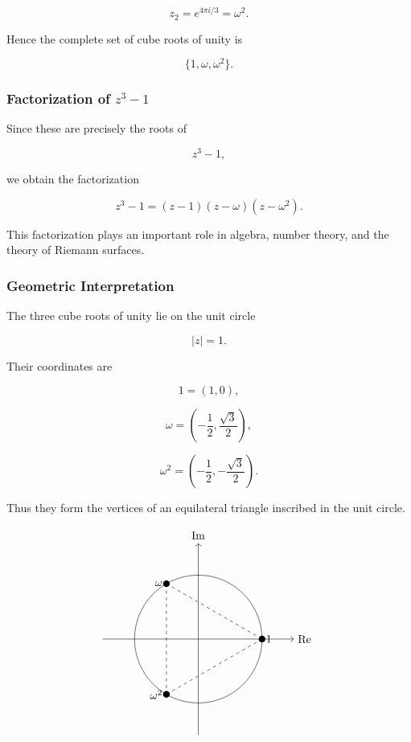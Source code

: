 \documentclass[12pt,a4paper]{article}
\theoremstyle{notespace}
\begin{document}
\[
z_2=e^{4\pi i/3}=\omega^2.
\]

Hence the complete set of cube roots of unity is

\[
\boxed{\{1,\omega,\omega^2\}}.
\]

\subsubsection{Factorization of \(z^3-1\)}

Since these are precisely the roots of

\[
z^3-1,
\]

we obtain the factorization

\[
z^3-1
=
(z-1)(z-\omega)(z-\omega^2).
\]

This factorization plays an important role in algebra, number theory, and the theory of Riemann surfaces.

\subsubsection{Geometric Interpretation}

The three cube roots of unity lie on the unit circle

\[
|z|=1.
\]

Their coordinates are

\[
1=(1,0),
\]

\[
\omega=
\left(
-\frac12,
\frac{\sqrt3}{2}
\right),
\]

\[
\omega^2=
\left(
-\frac12,
-\frac{\sqrt3}{2}
\right).
\]

Thus they form the vertices of an equilateral triangle inscribed in the unit circle.

\[
\begin{tikzpicture}[scale=2]
	
	\draw[->] (-1.5,0)--(1.5,0) node[right] {\(\operatorname{Re}\)};
	\draw[->] (0,-1.5)--(0,1.5) node[above] {\(\operatorname{Im}\)};
	
	\draw (0,0) circle (1);
	
	\fill (1,0) circle (1.5pt);
	\fill (-0.5,0.866) circle (1.5pt);
	\fill (-0.5,-0.866) circle (1.5pt);
	
	\node[right] at (1,0) {\(1\)};
	\node[left] at (-0.5,0.866) {\(\omega\)};
	\node[left] at (-0.5,-0.866) {\(\omega^2\)};
	
	\draw[dashed] (1,0)--(-0.5,0.866);
	\draw[dashed] (-0.5,0.866)--(-0.5,-0.866);
	\draw[dashed] (-0.5,-0.866)--(1,0);
	
\end{tikzpicture}
\]
\end{document}
